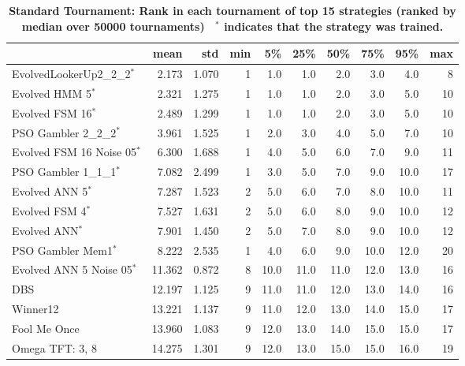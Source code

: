 \documentclass[10pt,letterpaper]{article}
\begin{document}
\begin{table}[!hbtp]
    \centering
        \caption{\bf Standard Tournament: Rank in each tournament
        of top 15 strategies (ranked by median over
        50000 tournaments)
        ~$^{*}$ indicates that the strategy was trained.}
    \footnotesize
\begin{tabular}{lrrrrrrrrr}
\toprule
{} &    mean &    std &  min &    5\% &   25\% &   50\% &   75\% &   95\% &  max \\
\midrule
EvolvedLookerUp2\_2\_2$^{*}$    &   2.173 &  1.070 &    1 &   1.0 &   1.0 &   2.0 &   3.0 &   4.0 &    8 \\
Evolved HMM 5$^{*}$           &   2.321 &  1.275 &    1 &   1.0 &   1.0 &   2.0 &   3.0 &   5.0 &   10 \\
Evolved FSM 16$^{*}$          &   2.489 &  1.299 &    1 &   1.0 &   1.0 &   2.0 &   3.0 &   5.0 &   10 \\
PSO Gambler 2\_2\_2$^{*}$       &   3.961 &  1.525 &    1 &   2.0 &   3.0 &   4.0 &   5.0 &   7.0 &   10 \\
Evolved FSM 16 Noise 05$^{*}$ &   6.300 &  1.688 &    1 &   4.0 &   5.0 &   6.0 &   7.0 &   9.0 &   11 \\
PSO Gambler 1\_1\_1$^{*}$       &   7.082 &  2.499 &    1 &   3.0 &   5.0 &   7.0 &   9.0 &  10.0 &   17 \\
Evolved ANN 5$^{*}$           &   7.287 &  1.523 &    2 &   5.0 &   6.0 &   7.0 &   8.0 &  10.0 &   11 \\
Evolved FSM 4$^{*}$           &   7.527 &  1.631 &    2 &   5.0 &   6.0 &   8.0 &   9.0 &  10.0 &   12 \\
Evolved ANN$^{*}$             &   7.901 &  1.450 &    2 &   5.0 &   7.0 &   8.0 &   9.0 &  10.0 &   12 \\
PSO Gambler Mem1$^{*}$        &   8.222 &  2.535 &    1 &   4.0 &   6.0 &   9.0 &  10.0 &  12.0 &   20 \\
Evolved ANN 5 Noise 05$^{*}$  &  11.362 &  0.872 &    8 &  10.0 &  11.0 &  11.0 &  12.0 &  13.0 &   16 \\
DBS                           &  12.197 &  1.125 &    9 &  11.0 &  11.0 &  12.0 &  13.0 &  14.0 &   16 \\
Winner12                      &  13.221 &  1.137 &    9 &  11.0 &  12.0 &  13.0 &  14.0 &  15.0 &   17 \\
Fool Me Once                  &  13.960 &  1.083 &    9 &  12.0 &  13.0 &  14.0 &  15.0 &  15.0 &   17 \\
Omega TFT: 3, 8               &  14.275 &  1.301 &    9 &  12.0 &  13.0 &  15.0 &  15.0 &  16.0 &   19 \\
\bottomrule
\end{tabular}
        \label{tbl:standard_ranks}
\end{table}
\end{document}
